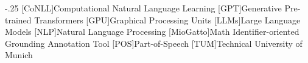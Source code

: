\documentclass[headsepline,footsepline,footinclude=false,oneside,fontsize=11pt,paper=a4,listof=totoc,bibliography=totoc]{scrbook} %
\begin{document}


\frontmatter{}





\tableofcontents{}

\mainmatter{}









\appendix{}



\begin{acronym}
	\itemsep-.25\baselineskip
	[CoNLL]{Computational Natural Language Learning}
	[GPT]{Generative Pre-trained Transformers}
	[GPU]{Graphical Processing Units}
	[LLMs]{Large Language Models}
	[NLP]{Natural Language Processing}
	[MioGatto]{Math Identifier-oriented Grounding Annotation Tool}
	[POS]{Part-of-Speech}
	[TUM]{Technical University of Munich}
\end{acronym}

\listoffigures{}
\listoftables{}
\printbibliography{}
\end{document}

